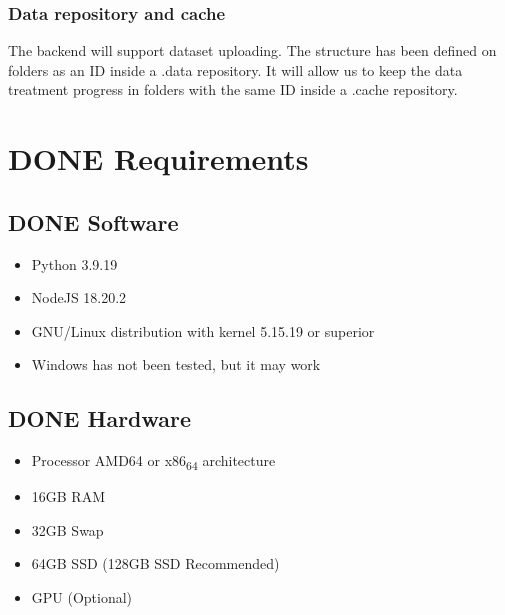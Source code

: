\documentclass[a4paper]{article}
\begin{document}
\sffamily \footnotesize
\begin{center}

\end{center}
\rmfamily \normalsize

\subsubsection{Data repository and cache}
\label{sec:org1aed965}

The backend will support dataset uploading. The structure has been defined on folders as an ID inside a .data repository. It will allow us to keep the data treatment progress in folders with the same ID inside a .cache repository.

\section{{\bfseries\sffamily DONE} Requirements}
\label{sec:org3a6051f}

\subsection{{\bfseries\sffamily DONE} Software}
\label{sec:org06b700b}

\begin{itemize}
\item Python 3.9.19

\item NodeJS 18.20.2

\item GNU/Linux distribution with kernel 5.15.19 or superior

\item Windows has not been tested, but it may work
\end{itemize}

\subsection{{\bfseries\sffamily DONE} Hardware}
\label{sec:org77b7d69}

\begin{itemize}
\item Processor AMD64 or x86\textsubscript{64} architecture

\item 16GB RAM

\item 32GB Swap

\item 64GB SSD (128GB SSD Recommended)

\item GPU (Optional)
\end{itemize}
\end{document}
